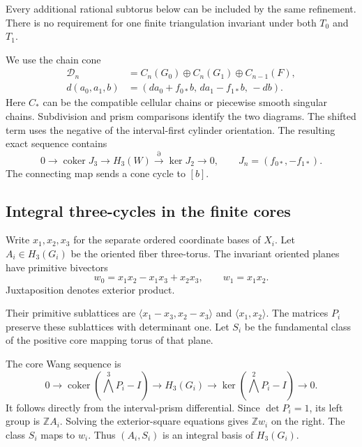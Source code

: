 Every additional rational subtorus below can be included by the same refinement.
There is no requirement for one finite triangulation invariant under both $T_0$ and $T_1$.

We use the chain cone
\begin{equation}\label{th:eq:cone}
\begin{aligned}
\mathcal D_n&=C_n(G_0)\oplus C_n(G_1)\oplus C_{n-1}(F),\\
d(a_0,a_1,b)&=(da_0+f_{0*}b,\,da_1-f_{1*}b,\,-db).
\end{aligned}
\end{equation}
Here $C_*$ can be the compatible cellular chains or piecewise smooth singular chains.
Subdivision and prism comparisons identify the two diagrams.
The shifted term uses the negative of the interval-first cylinder orientation.
The resulting exact sequence contains
\begin{equation}\label{th:eq:sequence}
0\longrightarrow\operatorname{coker}J_3
\longrightarrow H_3(W)\xrightarrow{\partial}\ker J_2
\longrightarrow0,\qquad J_n=(f_{0*},-f_{1*}).
\end{equation}
The connecting map sends a cone cycle to $[b]$.

\subsection{Integral three-cycles in the finite cores}

Write $x_1,x_2,x_3$ for the separate ordered coordinate bases of $X_i$.
Let $A_i\in H_3(G_i)$ be the oriented fiber three-torus.
The invariant oriented planes have primitive bivectors
\[
w_0=x_1x_2-x_1x_3+x_2x_3,\qquad w_1=x_1x_2.
\]
Juxtaposition denotes exterior product.

Their primitive sublattices are
$\langle x_1-x_3,x_2-x_3\rangle$ and $\langle x_1,x_2\rangle$.
The matrices $P_i$ preserve these sublattices with determinant one.
Let $S_i$ be the fundamental class of the positive core mapping torus of that plane.

The core Wang sequence is
\[
0\longrightarrow
\operatorname{coker}(\bigwedge^3P_i-I)
\longrightarrow H_3(G_i)
\longrightarrow\ker(\bigwedge^2P_i-I)
\longrightarrow0.
\]
It follows directly from the interval-prism differential.
Since $\det P_i=1$, its left group is $\mathbb Z A_i$.
Solving the exterior-square equations gives $\mathbb Zw_i$ on the right.
The class $S_i$ maps to $w_i$.
Thus $(A_i,S_i)$ is an integral basis of $H_3(G_i)$.

